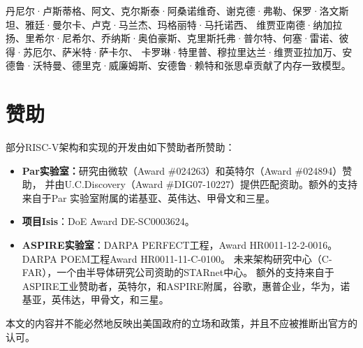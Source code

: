 丹尼尔·卢斯蒂格、阿文、克尔斯泰·阿桑诺维奇、谢克德·弗勒、保罗·洛文斯坦、雅廷·曼尔卡、卢克·马兰杰、玛格丽特·马托诺西、
维贾亚南德·纳加拉扬、里希尔·尼希尔、乔纳斯·奥伯豪斯、克里斯托弗·普尔特、何塞·雷诺、彼得·苏厄尔、萨米特·萨卡尔、
卡罗琳·特里普、穆拉里达兰·维贾亚拉加万、安德鲁·沃特曼、德里克·威廉姆斯、安德鲁·赖特和张思卓贡献了内存一致模型。

\section{赞助}

部分RISC-V架构和实现的开发由如下赞助者所赞助：
\begin{itemize}

\item {\bf Par实验室：}研究由微软（Award \#024263）和英特尔（Award \#024894）赞助，
并由U.C.Discovery（Award \#DIG07-10227）提供匹配资助。额外的支持来自于Par 实验室附属的诺基亚、英伟达、甲骨文和三星。

\item {\bf 项目Isis}：DoE Award DE-SC0003624。 

\item {\bf ASPIRE实验室}：DARPA PERFECT工程，Award HR0011-12-2-0016。DARPA POEM工程Award HR0011-11-C-0100。
未来架构研究中心（C-FAR），一个由半导体研究公司资助的STARnet中心。
额外的支持来自于ASPIRE工业赞助者，英特尔，和ASPIRE附属，谷歌，惠普企业，华为，诺基亚，英伟达，甲骨文，和三星。

\end{itemize}

本文的内容并不能必然地反映出美国政府的立场和政策，并且不应被推断出官方的认可。
